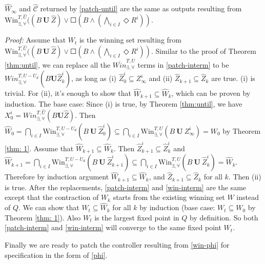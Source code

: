 \begin{theorem}
	$ \widehat{W}_\infty $ and $ \widehat{\mathcal{C}} $ returned by \eqref{patch-until} are the same as outputs resulting from $\text{Win}_{\exists,\forall}^{T,\widehat{U}}((B\mathbf{\ U\ }\widehat{Z})\vee \Square(B\wedge (\bigwedge_{i\in I} \Diamond R^i)) $. \label{thm:interm}	
\end{theorem}
\emph{Proof:} Assume that $ W_t $ is the winning set resulting from $\text{Win}_{\exists,\forall}^{T,\widehat{U}}((B\mathbf{\ U\ }\widehat{Z})\vee \Square(B\wedge (\bigwedge_{i\in I} \Diamond R^i)) $. Similar to the proof of Theorem \ref{thm:until}, we can replace all the $ \overline{Win}^{T,U}_{\exists,\forall} $ terms in \eqref{patch-interm} to be $ Win^{T,U-U_d}_{\exists,\forall}(B\mathbf{U}\widehat{Z}_k^i) $, as long as (i) $ \widehat{Z}_0^i\subseteq Z_\infty^i $ and (ii) $ \widehat{Z}_{k+1} \subseteq \widehat{Z}_{k} $ are true. (i) is trivial. For (ii), it's enough to show that $ \widehat{W}_{k+1}\subseteq \widehat{W}_k $, which can be proven by induction. The base case: Since (i) is true, by Theorem \ref{thm:until}, we have $ X_0^i = Win_{\exists,\forall}^{T,\widehat{U}}(B\mathbf{U}\widehat{Z}) $. Then $ \widehat{W}_0 =\bigcap_{i\in I} \text{Win}_{\exists,\forall}^{T,U-U_d}(B\mathbf{\ U\ }\widehat{Z}_0^i)\subseteq \bigcap_{i\in I} \text{Win}_{\exists,\forall}^{T,U}(B\mathbf{\ U\ }Z_{\infty}^i) = W_0 $ by Theorem \ref{thm: 1}. Assume that $ \widehat{W}_{k+1} \subseteq \widehat{W}_k $.  Then $ \widehat{Z}_{k+1}^i\subseteq \widehat{Z}_{k}^i  $ and $ \widehat{W}_{k+1} =\bigcap_{i\in I} \text{Win}_{\exists,\forall}^{T,U-U_d}(B\mathbf{\ U\ }\widehat{Z}_{k+1}^i)\subseteq \bigcap_{i\in I} \text{Win}_{\exists,\forall}^{T,U}(B\mathbf{\ U\ }\widehat{Z}_{k}^i) = \widehat{W}_k $. Therefore by induction argument $ \widehat{W}_{k+1}\subseteq \widehat{W}_k $, and $ \widehat{Z}_{k+1}\subseteq \widehat{Z}_k $ for all $ k $. Then (ii) is true. After the replacements, \eqref{patch-interm} and \eqref{win-interm} are the same except that the contraction of $ W_k $ starts from the existing winning set $ W $ instead of $ Q $. We can show that $ W_t \subseteq \widehat{W}_k $ for all $ k $ by induction (base case: $ W_t \subseteq W_0$ by Theorem \ref{thm: 1}). Also $ W_t $ is the largest fixed point in $ Q $ by definition. So both \eqref{patch-interm} and \eqref{win-interm} will converge to the same fixed point $ W_t$.  \QEDB

Finally we are ready to patch the controller resulting from \eqref{win-phi} for specification in the form of \eqref{phi}.

